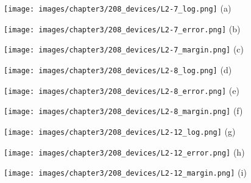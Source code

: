 \begin{figure}[!hbtp]
    \centering
    \begin{minipage}[t][20cm][t]{1\textwidth}
        \begin{minipage}[t]{0.3\textwidth}
            \centering
            \texttt{[image: images/chapter3/208\_devices/L2-7\_log.png]}
            (a)
        \end{minipage}
        \hfill
        \begin{minipage}[t]{0.3\textwidth}
            \centering
            \texttt{[image: images/chapter3/208\_devices/L2-7\_error.png]}
            (b)
        \end{minipage}
        \hfill
        \begin{minipage}[t]{0.3\textwidth}
            \centering
            \texttt{[image: images/chapter3/208\_devices/L2-7\_margin.png]}
            (c)
        \end{minipage}
        \vfill
        \begin{minipage}[t]{0.3\textwidth}
            \centering
            \texttt{[image: images/chapter3/208\_devices/L2-8\_log.png]}
            (d)
        \end{minipage}
        \hfill
        \begin{minipage}[t]{0.3\textwidth}
            \centering
            \texttt{[image: images/chapter3/208\_devices/L2-8\_error.png]}
            (e)
        \end{minipage}
        \hfill
        \begin{minipage}[t]{0.3\textwidth}
            \centering
            \texttt{[image: images/chapter3/208\_devices/L2-8\_margin.png]}
            (f)
        \end{minipage}
        \vfill
        \begin{minipage}[t]{0.3\textwidth}
            \centering
            \texttt{[image: images/chapter3/208\_devices/L2-12\_log.png]}
            (g)
        \end{minipage}
        \hfill
        \begin{minipage}[t]{0.3\textwidth}
            \centering
            \texttt{[image: images/chapter3/208\_devices/L2-12\_error.png]}
            (h)
        \end{minipage}
        \hfill
        \begin{minipage}[t]{0.3\textwidth}
            \centering
            \texttt{[image: images/chapter3/208\_devices/L2-12\_margin.png]}
            (i)
        \end{minipage}

    \end{minipage}
    \caption{}
    \label{fig:SD_Device}
\end{figure}



